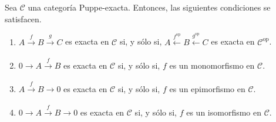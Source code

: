 \documentclass[tesis]{subfiles}
\begin{document}
\begin{Prop}\label{Mendoza-1.7.3}
    Sea $\mathscr{C}$ una categoría Puppe-exacta. Entonces, las siguientes condiciones se satisfacen.
    \begin{enumerate}[label=(\alph*)]

        \item $A\xrightarrow[]{f} B\xrightarrow[]{g} C$ es exacta en $\mathscr{C}$ si, y sólo si, $A\xleftarrow[]{f^\text{op}} B\xleftarrow[]{g^\text{op}} C$ es exacta en $\mathscr{C}^\text{op}$.
    
        \item $0\to A\xrightarrow[]{f} B$ es exacta en $\mathscr{C}$ si, y sólo si, $f$ es un monomorfismo en $\mathscr{C}$.

        \item $A\xrightarrow[]{f} B\to 0$ es exacta en $\mathscr{C}$ si, y sólo si, $f$ es un epimorfismo en $\mathscr{C}$.

        \item $0\to A\xrightarrow[]{f} B \to 0$ es exacta en $\mathscr{C}$ si, y sólo si, $f$ es un isomorfismo en $\mathscr{C}$.
    \end{enumerate}
\end{Prop}
\end{document}
